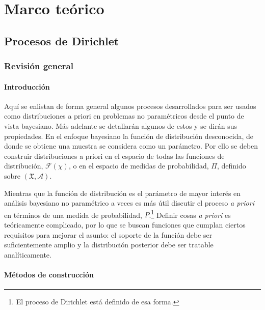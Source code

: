 \chapter{Marco teórico}
\label{ch:marcot}


\section{Procesos de Dirichlet}


\subsection{Revisión general}
\subsubsection{Introducción}

Aquí se enlistan de forma general algunos procesos desarrollados para ser usados como distribuciones a priori en problemas no paramétricos %
desde el punto de vista bayesiano. Más adelante se detallarán algunos de estos y se dirán sus propiedades. En el enfoque bayesiano %
la función de distribución desconocida, de donde se obtiene una muestra se considera como un parámetro. Por ello se deben construir %
distribuciones a priori en el espacio de todas las funciones de distribución, $\mathcal{F} \left( \chi \right)$, o en el espacio de %
medidas de probabilidad, $\Pi$, definido sobre $\left( \mathfrak{X}, \mathcal{A} \right)$.

Mientras que la función de distribución es el parámetro de mayor interés en análisis bayesiano no paramétrico a veces es más útil %
discutir el proceso \textit{a priori} en términos de una medida de probabilidad, $P$.\footnote{El proceso de Dirichlet está %
definido de esa forma.} %
Definir cosas \textit{a priori} es teóricamente complicado, por lo que se buscan funciones que cumplan ciertos requisitos para mejorar %
el asunto: el soporte de la función debe ser suficientemente amplio y la distribución posterior debe ser tratable analíticamente. 

\subsubsection{Métodos de construcción}

